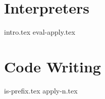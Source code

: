 \documentclass{exam}
\begin{document}
\section{Interpreters}
\begin{questions}
{intro.tex}
{eval-apply.tex}
\end{questions}

\section{Code Writing}
\begin{questions}
{is-prefix.tex}
{apply-n.tex}
\end{questions}
\end{document}
